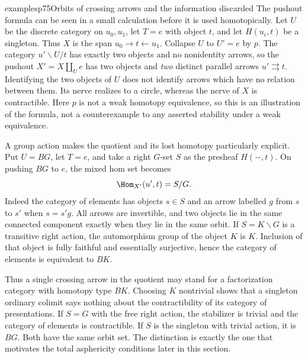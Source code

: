 \begin{dcomment}{examples}{p75}{Orbits of crossing arrows and the information discarded}
The pushout formula can be seen in a small calculation before it is used homotopically. Let $U$ be the discrete category on $u_0,u_1$, let $T=e$ with object $t$, and let $H(u_i,t)$ be a singleton. Thus $X$ is the span $u_0\to t\leftarrow u_1$. Collapse $U$ to $U'=e$ by $p$. The category $u'\backslash U/t$ has exactly two objects and no nonidentity arrows, so the pushout $X'=X\amalg_Ue$ has two objects and \emph{two} distinct parallel arrows $u'\rightrightarrows t$. Identifying the two objects of $U$ does not identify arrows which have no relation between them. Its nerve realizes to a circle, whereas the nerve of $X$ is contractible. Here $p$ is not a weak homotopy equivalence, so this is an illustration of the formula, not a counterexample to any asserted stability under a weak equivalence.

A group action makes the quotient and its lost homotopy particularly explicit. Put $U=BG$, let $T=e$, and take a right $G$-set $S$ as the presheaf $H(-,t)$. On pushing $BG$ to $e$, the mixed hom set becomes
\[
 \Hom_{X'}(u',t)=S/G.
\]
Indeed the category of elements has objects $s\in S$ and an arrow labelled $g$ from $s$ to $s'$ when $s=s'g$. All arrows are invertible, and two objects lie in the same connected component exactly when they lie in the same orbit. If $S=K\backslash G$ is a transitive right action, the automorphism group of the object $K$ is $K$. Inclusion of that object is fully faithful and essentially surjective, hence the category of elements is equivalent to $BK$.

Thus a single crossing arrow in the quotient may stand for a factorization category with homotopy type $BK$. Choosing $K$ nontrivial shows that a singleton ordinary colimit says nothing about the contractibility of its category of presentations. If $S=G$ with the free right action, the stabilizer is trivial and the category of elements is contractible. If $S$ is the singleton with trivial action, it is $BG$. Both have the same orbit set. The distinction is exactly the one that motivates the total asphericity conditions later in this section.
\end{dcomment}

